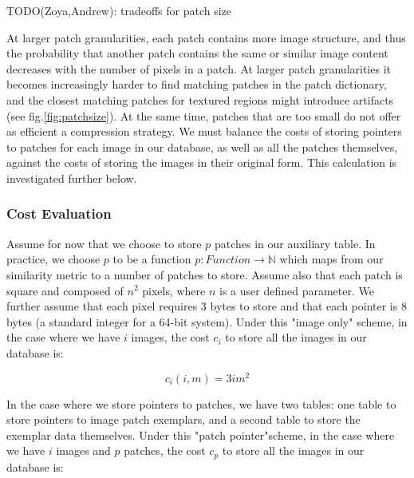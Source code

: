 TODO(Zoya,Andrew): tradeoffs for patch size

At larger patch granularities, each patch contains more image structure, and thus the probability that another patch contains the same or similar image content decreases with the number of pixels in a patch. At larger patch granularities it becomes increasingly harder to find matching patches in the patch dictionary, and the closest matching patches for textured regions might introduce artifacts (see fig.\ref{fig:patchsize}). At the same time, patches that are too small do not offer as efficient a compression strategy. We must balance the costs of storing pointers to patches for each image in our database, as well as all the patches themselves, against the costs of storing the images in their original form. This calculation is investigated further below. 


\subsubsection{Cost Evaluation}

Assume for now that we choose to store $p$ patches in our auxiliary table.  In practice, we choose $p$ to be a function $p \colon Function \to \mathds{N}$ which maps from our similarity metric to a number of patches to store.  Assume also that each patch is square and composed of $n^2$ pixels, where $n$ is a user defined parameter.  We further assume that each pixel requires 3 bytes to store  and that each pointer is 8 bytes (a standard integer for a 64-bit system).  Under this "image only" scheme, in the case where we have $i$ images, the cost $c_i$ to store all the images in our database is:

\begin{equation}
	c_i(i, m) = 3  i  m^2
\end{equation}

In the case where we store pointers to patches, we have two tables: one table to store pointers to image patch exemplars, and a second table to store the exemplar data themselves.  Under this "patch pointer"scheme, in the case where we have $i$ images and $p$ patches, the cost $c_p$ to store all the images in our database is:

